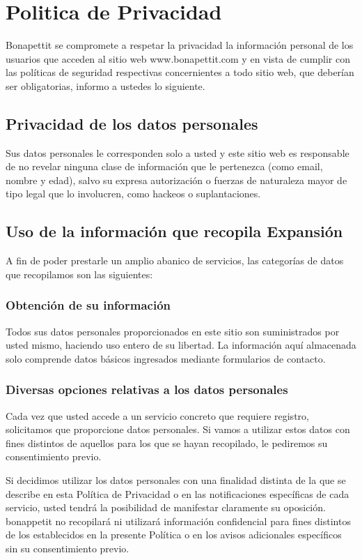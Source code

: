 \chapter{Politica de Privacidad}
Bonapettit se compromete a respetar la privacidad la información personal de los
usuarios que acceden al sitio web www.bonapettit.com y en vista de cumplir con las
políticas de seguridad respectivas concernientes a todo sitio web, que deberían ser obligatorias, informo a ustedes lo siguiente.  

\section{Privacidad de los datos personales}
Sus datos personales le corresponden solo a usted y este sitio web es responsable de no revelar ninguna clase de información que le pertenezca (como email, nombre y edad), salvo su expresa autorización o fuerzas de naturaleza mayor de tipo legal que lo involucren, como hackeos o suplantaciones.

\section{Uso de la información que recopila Expansión}
A fin de poder prestarle un amplio abanico de servicios, las categorías de datos que recopilamos son las siguientes:

\subsection{Obtención de su información}
Todos sus datos personales proporcionados en este sitio son suministrados por usted mismo, haciendo uso entero de su libertad. La información aquí almacenada solo comprende datos básicos ingresados mediante formularios de contacto.
\newpage
\subsection{Diversas opciones relativas a los datos personales}
Cada vez que usted accede a un servicio concreto que requiere registro, solicitamos que proporcione datos personales. Si vamos a utilizar estos datos con fines distintos de aquellos para los que se hayan recopilado, le pediremos su consentimiento previo.


Si decidimos utilizar los datos personales con una finalidad distinta de la que se describe en esta Política de Privacidad o en las notificaciones específicas de cada servicio, usted tendrá la posibilidad de manifestar claramente su oposición.
bonappetit no recopilará ni utilizará información confidencial para fines distintos de los establecidos en la presente Política o en los avisos adicionales específicos sin su consentimiento previo.

